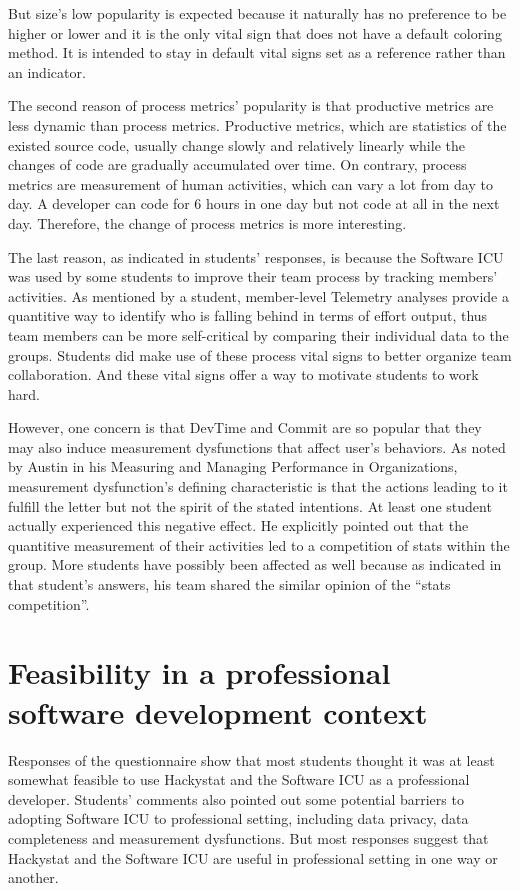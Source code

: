 But size's low popularity is expected because it naturally has no preference to be higher or lower and it is the only vital sign that does not have a default coloring method. It is intended to stay in default vital signs set as a reference rather than an indicator.

The second reason of process metrics' popularity is that productive metrics are less dynamic than process metrics. Productive metrics, which are statistics of the existed source code, usually change slowly and relatively linearly while the changes  of code are gradually accumulated over time. On contrary, process metrics are measurement of human activities, which can vary a lot from day to day. A developer can code for 6 hours in one day but not code at all in the next day. Therefore, the change of process metrics is more interesting.

The last reason, as indicated in students' responses, is because the Software ICU was used by some students to improve their team process by tracking members' activities. As mentioned by a student, member-level Telemetry analyses provide a quantitive way to identify who is falling behind in terms of effort output, thus team members can be more self-critical by comparing their individual data to the groups. Students did make use of these process vital signs to better organize team collaboration. And these vital signs offer a way to motivate students to work hard.

However, one concern is that DevTime and Commit are so popular that they may also induce measurement dysfunctions that affect user's behaviors. As noted by Austin in his Measuring and Managing Performance in Organizations\cite{Austin96}, measurement dysfunction's defining characteristic is that the actions leading to it fulfill the letter but not the spirit of the stated intentions. At least one student actually experienced this negative effect. He explicitly pointed out that the quantitive measurement of their activities led to a competition of stats within the group. More students have possibly been affected as well because as indicated in that student's answers, his team shared the similar opinion of the ``stats competition''.

\section {Feasibility in a professional software development context}
Responses of the questionnaire show that most students thought it was at least somewhat feasible to use Hackystat and the Software ICU as a professional developer. Students' comments also pointed out some potential barriers to adopting Software ICU to professional setting, including data privacy, data completeness and measurement dysfunctions. But most responses suggest that Hackystat and the Software ICU are useful in professional setting in one way or another.

